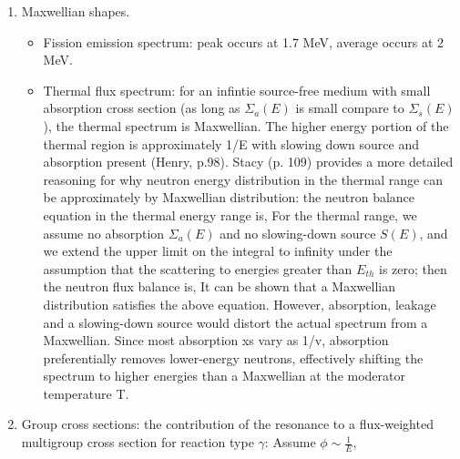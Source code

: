 \documentclass{school-22.211-notes}
\begin{document}
\begin{enumerate}
\item Maxwellian shapes.
  \begin{itemize}
  \item Fission emission spectrum: peak occurs at 1.7 MeV, average occurs at 2 MeV.
  \item Thermal flux spectrum: for an infintie source-free medium with small absorption cross section (as long as $\Sigma_a(E)$ is small compare to $\Sigma_s(E)$), the thermal spectrum is Maxwellian. The higher energy portion of the thermal region is approximately 1/E with slowing down source and absorption present (Henry, p.98). Stacy (p. 109) provides a more detailed reasoning for why neutron energy distribution in the thermal range can be approximately by Maxwellian distribution: the neutron balance equation in the thermal energy range is, 
    For the thermal range, we assume no absorption $\Sigma_a(E)$ and no slowing-down source $S(E)$, and we extend the upper limit on the integral to infinity under the assumption that the scattering to energies greater than $E_{th}$ is zero; then the neutron flux balance is,
   It can be shown that a Maxwellian distribution satisfies the above equation. However, absorption, leakage and a slowing-down source would distort the actual spectrum from a Maxwellian. Since most absorption xs vary as 1/v, absorption preferentially removes lower-energy neutrons, effectively shifting the spectrum to higher energies than a Maxwellian at the moderator temperature T. 
  \end{itemize}
  
\item Group cross sections: the contribution of the resonance to a flux-weighted multigroup cross section for reaction type $\gamma$:
  Assume $\phi \sim \frac{1}{E}$,
 

\end{enumerate}
\end{document}
